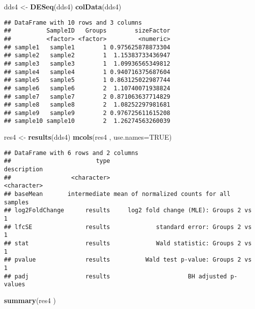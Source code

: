 \documentclass[]{article}
\newenvironment{Shaded}{\begin{snugshade}}{\end{snugshade}}
\newcommand{\DataTypeTok}[1]{\textcolor[rgb]{0.13,0.29,0.53}{#1}}
\newcommand{\KeywordTok}[1]{\textcolor[rgb]{0.13,0.29,0.53}{\textbf{#1}}}
\newcommand{\NormalTok}[1]{#1}
\newcommand{\OtherTok}[1]{\textcolor[rgb]{0.56,0.35,0.01}{#1}}
\newcommand{\StringTok}[1]{\textcolor[rgb]{0.31,0.60,0.02}{#1}}
\begin{document}
\begin{Shaded}
\begin{Highlighting}[]
\NormalTok{dds4 <-}\StringTok{ }\KeywordTok{DESeq}\NormalTok{(dds4)}
\KeywordTok{colData}\NormalTok{(dds4)}
\end{Highlighting}
\end{Shaded}

\begin{verbatim}
## DataFrame with 10 rows and 3 columns
##          SampleID   Groups        sizeFactor
##          <factor> <factor>         <numeric>
## sample1   sample1        1 0.975625878873304
## sample2   sample2        1  1.15383733436947
## sample3   sample3        1  1.09936565349812
## sample4   sample4        1 0.940716375687604
## sample5   sample5        1 0.863125022987744
## sample6   sample6        2  1.10740071938824
## sample7   sample7        2 0.871063637714829
## sample8   sample8        2  1.08252297981681
## sample9   sample9        2 0.976725611615208
## sample10 sample10        2  1.26274563260039
\end{verbatim}

\begin{Shaded}
\begin{Highlighting}[]
\NormalTok{res4 <-}\StringTok{ }\KeywordTok{results}\NormalTok{(dds4)}
\KeywordTok{mcols}\NormalTok{(res4 , }\DataTypeTok{use.names=}\OtherTok{TRUE}\NormalTok{)}
\end{Highlighting}
\end{Shaded}

\begin{verbatim}
## DataFrame with 6 rows and 2 columns
##                        type                               description
##                 <character>                               <character>
## baseMean       intermediate mean of normalized counts for all samples
## log2FoldChange      results     log2 fold change (MLE): Groups 2 vs 1
## lfcSE               results             standard error: Groups 2 vs 1
## stat                results             Wald statistic: Groups 2 vs 1
## pvalue              results          Wald test p-value: Groups 2 vs 1
## padj                results                      BH adjusted p-values
\end{verbatim}

\begin{Shaded}
\begin{Highlighting}[]
\KeywordTok{summary}\NormalTok{(res4 )}
\end{Highlighting}
\end{Shaded}
\end{document}
